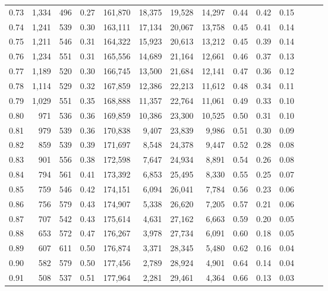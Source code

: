 \begin{tabular}{rrrrrrrrrrrrrr}
0.73 &  1,334 &  496 &  0.27 &  161,870 &   18,375 &  19,528 &  14,297 &  0.44 &  0.42 &      0.15 \\
0.74 &  1,241 &  539 &  0.30 &  163,111 &   17,134 &  20,067 &  13,758 &  0.45 &  0.41 &      0.14 \\
0.75 &  1,211 &  546 &  0.31 &  164,322 &   15,923 &  20,613 &  13,212 &  0.45 &  0.39 &      0.14 \\
0.76 &  1,234 &  551 &  0.31 &  165,556 &   14,689 &  21,164 &  12,661 &  0.46 &  0.37 &      0.13 \\
0.77 &  1,189 &  520 &  0.30 &  166,745 &   13,500 &  21,684 &  12,141 &  0.47 &  0.36 &      0.12 \\
0.78 &  1,114 &  529 &  0.32 &  167,859 &   12,386 &  22,213 &  11,612 &  0.48 &  0.34 &      0.11 \\
0.79 &  1,029 &  551 &  0.35 &  168,888 &   11,357 &  22,764 &  11,061 &  0.49 &  0.33 &      0.10 \\
0.80 &    971 &  536 &  0.36 &  169,859 &   10,386 &  23,300 &  10,525 &  0.50 &  0.31 &      0.10 \\
0.81 &    979 &  539 &  0.36 &  170,838 &    9,407 &  23,839 &   9,986 &  0.51 &  0.30 &      0.09 \\
0.82 &    859 &  539 &  0.39 &  171,697 &    8,548 &  24,378 &   9,447 &  0.52 &  0.28 &      0.08 \\
0.83 &    901 &  556 &  0.38 &  172,598 &    7,647 &  24,934 &   8,891 &  0.54 &  0.26 &      0.08 \\
0.84 &    794 &  561 &  0.41 &  173,392 &    6,853 &  25,495 &   8,330 &  0.55 &  0.25 &      0.07 \\
0.85 &    759 &  546 &  0.42 &  174,151 &    6,094 &  26,041 &   7,784 &  0.56 &  0.23 &      0.06 \\
0.86 &    756 &  579 &  0.43 &  174,907 &    5,338 &  26,620 &   7,205 &  0.57 &  0.21 &      0.06 \\
0.87 &    707 &  542 &  0.43 &  175,614 &    4,631 &  27,162 &   6,663 &  0.59 &  0.20 &      0.05 \\
0.88 &    653 &  572 &  0.47 &  176,267 &    3,978 &  27,734 &   6,091 &  0.60 &  0.18 &      0.05 \\
0.89 &    607 &  611 &  0.50 &  176,874 &    3,371 &  28,345 &   5,480 &  0.62 &  0.16 &      0.04 \\
0.90 &    582 &  579 &  0.50 &  177,456 &    2,789 &  28,924 &   4,901 &  0.64 &  0.14 &      0.04 \\
0.91 &    508 &  537 &  0.51 &  177,964 &    2,281 &  29,461 &   4,364 &  0.66 &  0.13 &      0.03 \\

\end{tabular}
